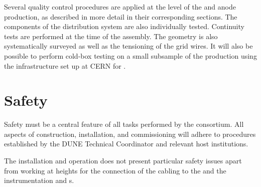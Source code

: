 Several quality control 
procedures are applied at the level of the  and anode production, as described in more detail in their corresponding sections. The components of the  distribution system are also individually tested. Continuity tests are performed at the time of the  assembly. The  geometry is also systematically surveyed as well as the tensioning of the grid wires. It will also be possible to perform cold-box testing on a small subsample of the  production using the infrastructure set up at CERN for .







\section{Safety}
\label{sec:fddp-crp-safety}

Safety must be a central feature of all tasks performed by the  consortium.  All aspects of  construction, installation, and commissioning will adhere to procedures established by the DUNE Technical Coordinator and relevant host institutions. 

The  installation and operation does not present particular safety issues apart from working at heights %
for the connection of the   cabling to the  and the instrumentation and  \fdth{}s.